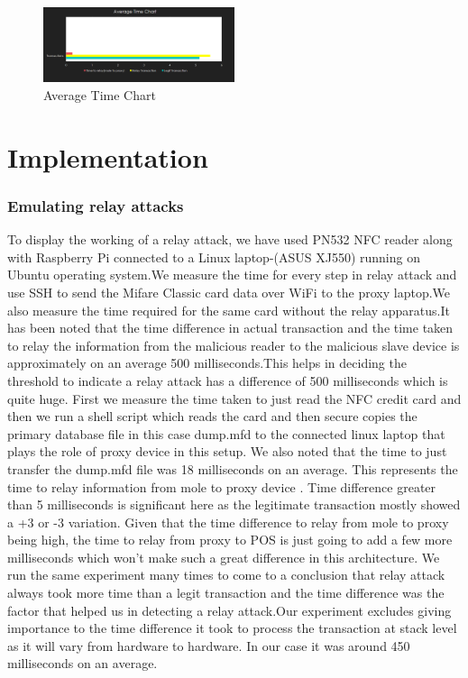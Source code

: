 \documentclass[conference]{IEEEtran}
\begin{document}
\begin{figure}[h]
\includegraphics[width=0.5\textwidth,height=0.2\textheight]{graph}
\caption{Average Time Chart}
\end{figure}
\section{Implementation}
\subsubsection{Emulating relay attacks}
To display the working of a relay attack, we have used PN532 NFC reader along with Raspberry Pi connected to a Linux laptop-(ASUS XJ550) running on Ubuntu operating system.We measure the time for every step in relay attack and use SSH to send the Mifare Classic card data over WiFi to the proxy laptop.We also measure the time required for the same card without the relay apparatus.It has been noted that the time difference in actual transaction and the time taken to relay the information from the malicious reader to the malicious slave device is approximately on an average 500 milliseconds.This helps in deciding the threshold to indicate a relay attack has a difference of 500 milliseconds which is quite huge.
First we measure the time taken to just read the NFC credit card and then we run a shell script which reads the card and then secure copies the primary database file in this case dump.mfd to the connected linux laptop that plays the role of proxy device in this setup. We also noted that the time to just transfer the dump.mfd file was 18 milliseconds on an average. This represents the time to relay information from mole to proxy device . Time difference greater than 5 milliseconds is significant here as the legitimate transaction mostly showed a +3 or -3 variation. Given that the time difference to relay from mole to proxy being high, the time to relay from proxy to POS is just going to add a few more milliseconds which won't make such a great difference in this architecture.  We run the same experiment many times to come to a conclusion that relay attack always took more time than a legit transaction and the time difference was the factor that helped us in detecting a relay attack.Our experiment excludes giving importance to the time difference it took to process the transaction at stack level as it will vary from hardware to hardware. In our case it was around 450 milliseconds on an average. 
\end{document}
